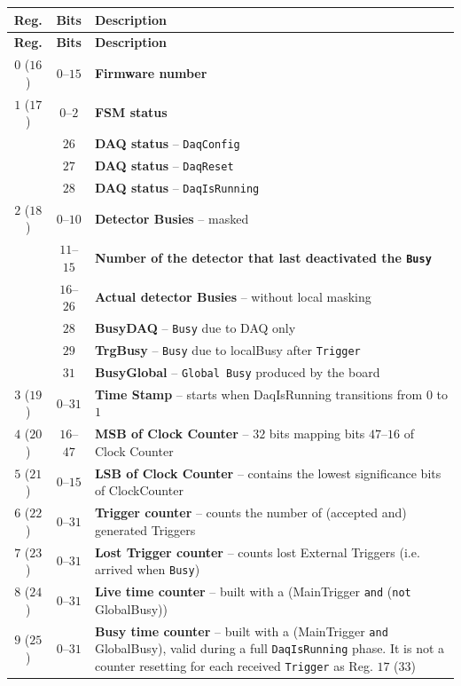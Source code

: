 {\footnotesize%
	\begin{longtable}[H]{|c|c|p{11.5cm}|}
		\hline
		\textbf{Reg.} & \textbf{Bits} & \textbf{Description} \\
		\hline
		\endfirsthead
		\hline
		\textbf{Reg.} & \textbf{Bits} & \textbf{Description} \\
		\hline
		\endhead
		$0$ ($16$) & $0$--$15$ & \textbf{Firmware number} \\
		\hline
		$1$ ($17$) & $0$--$2$ & \textbf{FSM status} \\
		& $26$ & \textbf{DAQ status} -- \texttt{DaqConfig} \\
		& $27$ & \textbf{DAQ status} -- \texttt{DaqReset} \\
		& $28$ & \textbf{DAQ status} -- \texttt{DaqIsRunning} \\
		\hline
		$2$ ($18$) & $0$--$10$ & \textbf{Detector Busies} -- masked \\
		& $11$--$15$ & \textbf{Number of the detector that last deactivated the \texttt{Busy}} \\
		& $16$--$26$ & \textbf{Actual detector Busies} -- without local masking \\
		& $28$ & \textbf{BusyDAQ} -- \texttt{Busy} due to DAQ only \\
		& $29$ & \textbf{TrgBusy} -- \texttt{Busy} due to localBusy after \texttt{Trigger} \\
		& $31$ & \textbf{BusyGlobal} -- \texttt{Global Busy} produced by the board \\
		\hline
		$3$ ($19$) & $0$--$31$ & \textbf{Time Stamp} -- starts when DaqIsRunning transitions from $0$ to $1$ \\
		\hline
		$4$ ($20$) & $16$--$47$ & \textbf{MSB of Clock Counter} -- $32$ bits mapping bits $47$--$16$ of Clock Counter \\
		\hline
		$5$ ($21$) & $0$--$15$ & \textbf{LSB of Clock Counter} -- contains the lowest significance bits of ClockCounter \\
		\hline
		$6$ ($22$) & $0$--$31$ & \textbf{Trigger counter} -- counts the number of (accepted and) generated Triggers\\
		\hline
		$7$ ($23$) & $0$--$31$ & \textbf{Lost Trigger counter} -- counts lost External Triggers (i.e. arrived when \texttt{Busy}) \\
		\hline
		$8$ ($24$) & $0$--$31$ & \textbf{Live time counter} -- built with a (MainTrigger \texttt{and} (\texttt{not} GlobalBusy)) \\
		\hline
		$9$ ($25$) & $0$--$31$ & \textbf{Busy time counter} -- built with a (MainTrigger \texttt{and} GlobalBusy), valid during a full \texttt{DaqIsRunning} phase. It is not a counter resetting for each received \texttt{Trigger} as Reg. $17$ ($33$) \\

\end{longtable}}
